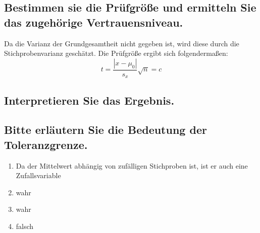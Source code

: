 \documentclass[12pt, a4paper, titlepage]{article}
\begin{document}
	\subsection{Bestimmen sie die Pr\"ufgr\"o\ss e und ermitteln Sie das zugeh\"orige Vertrauensniveau.}
	Da die Varianz der Grundgesamtheit nicht gegeben ist, wird diese durch die Stichprobenvarianz gesch\"atzt.
	Die Pr\"ufgr\"o\ss e ergibt sich folgenderma\ss en:
	$$t=\frac{|x - \mu_0|}{s_x}\sqrt{n} = c$$
	
	
	\subsection{Interpretieren Sie das Ergebnis.}


	

	\subsection{Bitte erl\"autern Sie die Bedeutung der Toleranzgrenze.}
	\begin{enumerate}
		\item Da der Mittelwert abh\"angig von zuf\"alligen Stichproben ist, ist er auch eine Zufallsvariable
		\item wahr
		\item wahr
		\item falsch
	\end{enumerate}
	
\end{document}
